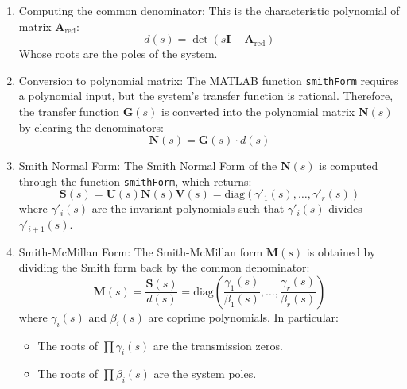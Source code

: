 \documentclass{scrreprt}
\begin{document}
\begin{enumerate}
    \item Computing the common denominator: This is the characteristic polynomial of matrix $\boldsymbol{A}_\text{red}$:
    \begin{equation}
        d(s) = \det(s\boldsymbol{I} - \boldsymbol{A}_\text{red})
    \end{equation}
    Whose roots are the poles of the system.

    \item Conversion to polynomial matrix: The MATLAB function \texttt{smithForm} requires a polynomial input, but the system's transfer function is rational. Therefore, the transfer function $\boldsymbol{G}(s)$ is converted into the polynomial matrix $\boldsymbol{N}(s)$ by clearing the denominators:
    \begin{equation}
        \boldsymbol{N}(s) = \boldsymbol{G}(s) \cdot d(s)
    \end{equation}

    \item Smith Normal Form:
    The Smith Normal Form of the $\boldsymbol{N}(s)$ is computed through the function \texttt{smithForm}, which returns:
    \begin{equation}
        \boldsymbol{S}(s) = \boldsymbol{U}(s) \boldsymbol{N}(s) \boldsymbol{V}(s) = \text{diag}(\gamma'_1(s), \dots, \gamma'_r(s))
    \end{equation}
    where $\gamma'_i(s)$ are the invariant polynomials such that $\gamma'_i(s)$ divides $\gamma'_{i+1}(s)$.

    \item Smith-McMillan Form:
    The Smith-McMillan form $\boldsymbol{M}(s)$ is obtained by dividing the Smith form back by the common denominator:
    \begin{equation}
        \boldsymbol{M}(s) = \frac{\boldsymbol{S}(s)}{d(s)} = \text{diag}\left( \frac{\gamma_1(s)}{\beta_1(s)}, \dots, \frac{\gamma_r(s)}{\beta_r(s)} \right)
    \end{equation}
    where $\gamma_i(s)$ and $\beta_i(s)$ are coprime polynomials. In particular:
    \begin{itemize}
        \item The roots of $\prod \gamma_i(s)$ are the transmission zeros.
        \item The roots of $\prod \beta_i(s)$ are the system poles.
    \end{itemize}
\end{enumerate}
\end{document}
